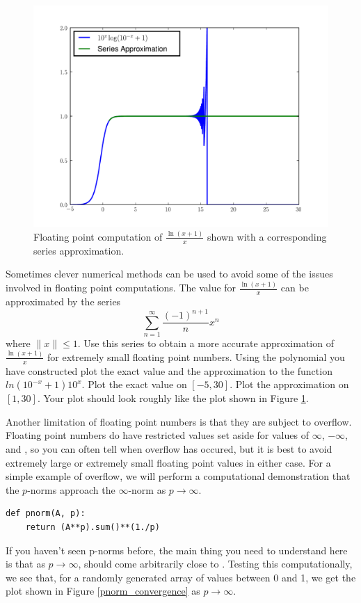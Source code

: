 \begin{figure}
\includegraphics[width=\textwidth]{lnseries.pdf}
\caption{Floating point computation of $\frac{\ln \left(x+1\right)}{x}$ shown with a corresponding series approximation.}
\label{floatbreak:lnseries}
\end{figure}

\begin{problem}
Sometimes clever numerical methods can be used to avoid some of the issues involved in floating point computations.
The value for $\frac{\ln \left(x+1\right)}{x}$ can be approximated by the series
\[
\sum_{n=1}^{\infty} \frac{\left( -1 \right)^{n+1}}{n} x^n
\]
where $\| x \| \leq 1$.
Use this series to obtain a more accurate approximation of $\frac{\ln \left(x+1\right)}{x}$ for extremely small floating point numbers.
Using the polynomial you have constructed plot the exact value and the approximation to the function $ln \left( 10^{-x} + 1 \right)10^{x}$.
Plot the exact value on $[-5, 30]$.
Plot the approximation on $[1, 30]$.
Your plot should look roughly like the plot shown in Figure \ref{floatbreak:lnseries}.
\end{problem}

Another limitation of floating point numbers is that they are subject to overflow.
Floating point numbers do have restricted values set aside for values of $\infty$, $-\infty$, and , so you can often tell when overflow has occured, but it is best to avoid extremely large or extremely small floating point values in either case.
For a simple example of overflow, we will perform a computational demonstration that the $p$-norms approach the $\infty$-norm as $p \rightarrow \infty$.
\begin{lstlisting}
def pnorm(A, p):
    return (A**p).sum()**(1./p)
\end{lstlisting}
If you haven't seen p-norms before, the main thing you need to understand here is that as $p \rightarrow \infty$,  should come arbitrarily close to .
Testing this computationally, we see that, for a randomly generated array of values between 0 and 1, we get the plot shown in Figure \ref{pnorm_convergence} as $p \rightarrow \infty$.

